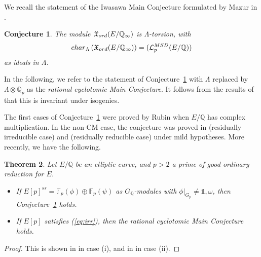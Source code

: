 \documentclass[10pt,reqno]{amsart}
\numberwithin{equation}{section}
\theoremstyle{plain}
\newtheorem{thm}{Theorem}[subsection] %
\theoremstyle{definition}
\newtheorem{rem}[thm]{Remark}
\theoremstyle{definition}
\theoremstyle{plain}
\theoremstyle{plain}
\theoremstyle{plain}
\theoremstyle{plain}
\newtheorem{conj}[thm]{Conjecture}
\theoremstyle{plain}
\theoremstyle{plain}
\newcommand{\Q}{\mathbb{Q}}
\newcommand{\X}{\mathfrak{X}}
\newcommand{\Lcal}{\mathcal{L}}
\begin{document}
We recall the statement of the Iwasawa Main Conjecture formulated by Mazur in \cite{mazur-towers}.

\begin{conj}%
\label{conj:cyc} The module $\X_{\rm ord}(E/\Q_{\infty})$ is $\Lambda$-torsion, with
\[
{\rm char}_\Lambda\left( \X_{\rm ord}(E/\Q_{\infty})\right)=(\Lcal^{\rm MSD}_p(E/\Q))
\]
as ideals in $\Lambda$. 
\end{conj}

In the following, we refer to the statement of Conjecture~\ref{conj:cyc} with $\Lambda$ replaced by $\Lambda\otimes\Q_p$ %
as the \emph{rational cyclotomic Main Conjecture}. It follows from the results of \cite{schneider-isogenies,PR-isogenies} that this is invariant under isogenies.

The first cases of Conjecture~\ref{conj:cyc} were proved by Rubin \cite{rubinmainconj} when $E/\Q$ has complex multiplication. In the non-CM case, the conjecture was  proved in \cite{kato-euler-systems,skinner-urban} (residually irreducible case) and \cite{kato-euler-systems,greenvats} (residually reducible case) under mild hypotheses. More recently, we have the following.

\begin{thm}
Let $E/\Q$ be an elliptic curve, and $p>2$ a prime of good ordinary reduction for $E$. 
\begin{itemize}
\item[(i)] If $E[p]^{ss}=\mathbb{F}_p(\phi)\oplus\mathbb{F}_p(\psi)$ as $G_\Q$-modules with $\phi\vert_{G_p}\neq\mathds{1},\omega$, then Conjecture~\ref{conj:cyc} holds.
\item[(ii)] If $E[p]$ satisfies {\rm (\ref{eq:irr})}, then the rational cyclotomic Main Conjecture holds.
\end{itemize}
\end{thm}

\begin{proof}
This is shown in \cite{eisenstein_cyc} in case (i), and in \cite{wan-hilbert} in case (ii).
\end{proof}
\end{document}

